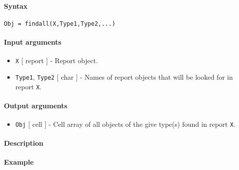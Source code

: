 


	\paragraph{Syntax}\label{syntax}

\begin{verbatim}
Obj = findall(X,Type1,Type2,...)
\end{verbatim}

\paragraph{Input arguments}\label{input-arguments}

\begin{itemize}
\item
  \texttt{X} {[} report {]} - Report object.
\item
  \texttt{Type1}, \texttt{Type2} {[} char {]} - Names of report objects
  that will be looked for in report \texttt{X}.
\end{itemize}

\paragraph{Output arguments}\label{output-arguments}

\begin{itemize}
\itemsep1pt\parskip0pt
\item
  \texttt{Obj} {[} cell {]} - Cell array of all objects of the give
  type(s) found in report \texttt{X}.
\end{itemize}

\paragraph{Description}\label{description}

\paragraph{Example}\label{example}


